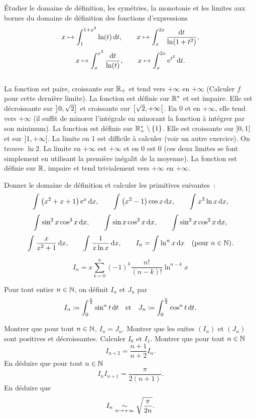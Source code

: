 \documentclass{magnolia}
\begin{document}
Étudier le domaine de définition, les symétries, la monotonie et les limites
aux bornes du domaine de définition des fonctions d'expressions
\[x\mapsto \integ{1}{1+x^2}{\ln(t)}{t}, \qquad
  x\mapsto \integinv{x}{2x}{\ln(1+t^2)}{t},\]
\[x\mapsto \integinv{x}{x^2}{\ln(t)}{t}, \qquad
  x\mapsto \integ{x}{2x}{\e^{t^2}}{t}.\]
\begin{sol}
$\quad$
\begin{questions}
\question La fonction est paire, croissante sur $\RP$ et tend vers $+\infty$
  en $+\infty$ (Calculer $f$ pour cette dernière limite).
\question La fonction est définie sur $\Rs$ et est impaire. Elle
  est décroissante sur $\interof{0}{\sqrt{2}}$ et croissante sur
  $\interfo{\sqrt{2}}{+\infty}$. En 0 et en $+\infty$, elle tend vers $+\infty$
  (il suffit de minorer l'intégrale en minorant la fonction à intégrer
  par son minimum).
\question La fonction est définie sur $\RPs\setminus\ens{1}$. Elle est
  croissante sur $\intero{0}{1}$ et sur $\intero{1}{+\infty}$. La limite en
  1 est difficile à calculer (voir un autre exercice). On trouve $\ln 2$.
  La limite en $+\infty$ est $+\infty$ et en 0 est 0 (ces deux limites
  se font simplement en utilisant la première inégalit de la moyenne).
\question La fonction est définie sur $\R$, impaire et tend trivialement vers
  $+\infty$ en $+\infty$.
\end{questions}
\end{sol}


Donner le domaine de définition et calculer les primitives suivantes~:
\[\prim{\p{x^2+x+1}\e^x}{x}, \qquad \prim{\p{x^2-1}\cos x}{x}, \qquad
  \prim{x^3\ln x}{x},\]
\[\prim{\sin^2 x\cos^3 x}{x}, \qquad \prim{\sin x\cos^2 x}{x}, \qquad
  \prim{\sin^2 x\cos^2 x}{x},\]
\[\prim{\frac{x}{x^2+1}}{x}, \qquad \prim{\frac{1}{x\ln x}}{x}, \qquad
  I_n=\prim{\ln^n x}{x} \quad (\text{pour $n\in\N$}).\]
\begin{sol}
\[I_n=x\sum_{k=0}^n (-1)^k \frac{n!}{(n-k)!}\ln^{n-k} x\]   
\end{sol}


Pour tout entier $n\in\N$, on définit $I_n$ et $J_n$ par
\[I_n\defeq\integ{0}{\frac{\pi}{2}}{\sin^n t}{t} \quad\text{et}\quad
  J_n\defeq\integ{0}{\frac{\pi}{2}}{\cos^n t}{t}.\]
\begin{questions}
\question Montrer que pour tout $n\in\N$, $I_n=J_n$.
\question Montrer que les suites $(I_n)$ et $(J_n)$ sont positives et
  décroissantes. Calculer $I_0$ et $I_1$.
\question Montrer que pour tout $n\in\N$
  \[I_{n+2}=\frac{n+1}{n+2}I_n.\]
\question En déduire que pour tout $n\in\N$
  \[I_n I_{n+1}=\frac{\pi}{2(n+1)}.\]
\question En déduire que
  \[I_n\equiS\sqrt{\frac{\pi}{2n}}.\]
\end{questions}
\end{document}
